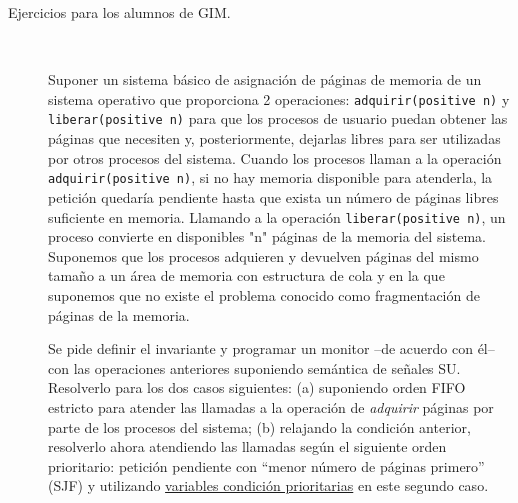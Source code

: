 \documentclass[12pt]{article}
\begin{document}
\begin{description}
        \item [Ejercicios para los alumnos de GIM.]~\\
            \begin{ejercicio}
                Suponer un sistema básico de asignación de páginas de memoria de un sistema operativo que proporciona 2 operaciones: \verb|adquirir(positive n)| y \verb|liberar(positive n)| para que los procesos de usuario puedan obtener las páginas que necesiten y, posteriormente, dejarlas libres para ser utilizadas por otros procesos del sistema. Cuando los procesos llaman a la operación \verb|adquirir(positive n)|, si no hay memoria disponible para atenderla, la petición quedaría pendiente hasta que exista un número de páginas libres suficiente en memoria. Llamando a la operación \verb|liberar(positive n)|, un proceso convierte en disponibles "n" páginas de la memoria del sistema. Suponemos que los procesos adquieren y devuelven páginas del mismo tamaño a un área de memoria con estructura de cola y en la que suponemos que no existe el problema conocido como fragmentación de páginas de la memoria.

                \noindent
                Se pide definir el invariante y programar un monitor –de acuerdo con él– con las operaciones anteriores suponiendo semántica de señales SU. Resolverlo para los dos casos siguientes: (a) suponiendo orden FIFO estricto para atender las llamadas a la operación de \textit{adquirir} páginas por parte de los procesos del sistema; (b) relajando la condición anterior, resolverlo ahora atendiendo las llamadas según el siguiente orden prioritario: petición pendiente con “menor número de páginas primero” (SJF) y utilizando \underline{variables condición prioritarias} en este segundo caso.
            \end{ejercicio}


\end{description}
\end{document}
